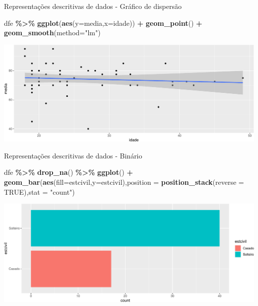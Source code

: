 \documentclass[
  9pt,
  ignorenonframetext,
  aspectratio=169]{beamer}
\newenvironment{Shaded}{\begin{snugshade}}{\end{snugshade}}
\newcommand{\DataTypeTok}[1]{\textcolor[rgb]{0.13,0.29,0.53}{#1}}
\newcommand{\KeywordTok}[1]{\textcolor[rgb]{0.13,0.29,0.53}{\textbf{#1}}}
\newcommand{\NormalTok}[1]{#1}
\newcommand{\OperatorTok}[1]{\textcolor[rgb]{0.81,0.36,0.00}{\textbf{#1}}}
\newcommand{\OtherTok}[1]{\textcolor[rgb]{0.56,0.35,0.01}{#1}}
\newcommand{\StringTok}[1]{\textcolor[rgb]{0.31,0.60,0.02}{#1}}
\begin{document}
\begin{frame}[fragile]{Representações descritivas de dados - Gráfico de
dispersão}
\protect\hypertarget{representauxe7uxf5es-descritivas-de-dados---gruxe1fico-de-dispersuxe3o}{}
\begin{Shaded}
\begin{Highlighting}[]
\NormalTok{dfe }\OperatorTok{\%\textgreater{}\%}
\StringTok{  }\KeywordTok{ggplot}\NormalTok{(}\KeywordTok{aes}\NormalTok{(}\DataTypeTok{y=}\NormalTok{media,}\DataTypeTok{x=}\NormalTok{idade)) }\OperatorTok{+}
\StringTok{  }\KeywordTok{geom\_point}\NormalTok{() }\OperatorTok{+}
\StringTok{  }\KeywordTok{geom\_smooth}\NormalTok{(}\DataTypeTok{method=}\StringTok{"lm"}\NormalTok{)}
\end{Highlighting}
\end{Shaded}

\includegraphics{aula_08_files/figure-beamer/unnamed-chunk-6-1.pdf}
\end{frame}

\begin{frame}[fragile]{Representações descritivas de dados - Binário}
\protect\hypertarget{representauxe7uxf5es-descritivas-de-dados---binuxe1rio}{}
\begin{Shaded}
\begin{Highlighting}[]
\NormalTok{dfe }\OperatorTok{\%\textgreater{}\%}
\StringTok{  }\KeywordTok{drop\_na}\NormalTok{() }\OperatorTok{\%\textgreater{}\%}
\StringTok{  }\KeywordTok{ggplot}\NormalTok{() }\OperatorTok{+}
\StringTok{  }\KeywordTok{geom\_bar}\NormalTok{(}\KeywordTok{aes}\NormalTok{(}\DataTypeTok{fill=}\NormalTok{estcivil,}\DataTypeTok{y=}\NormalTok{estcivil),}\DataTypeTok{position =} \KeywordTok{position\_stack}\NormalTok{(}\DataTypeTok{reverse =} \OtherTok{TRUE}\NormalTok{),}\DataTypeTok{stat =} \StringTok{"count"}\NormalTok{)}
\end{Highlighting}
\end{Shaded}

\includegraphics{aula_08_files/figure-beamer/unnamed-chunk-7-1.pdf}
\end{frame}
\end{document}
